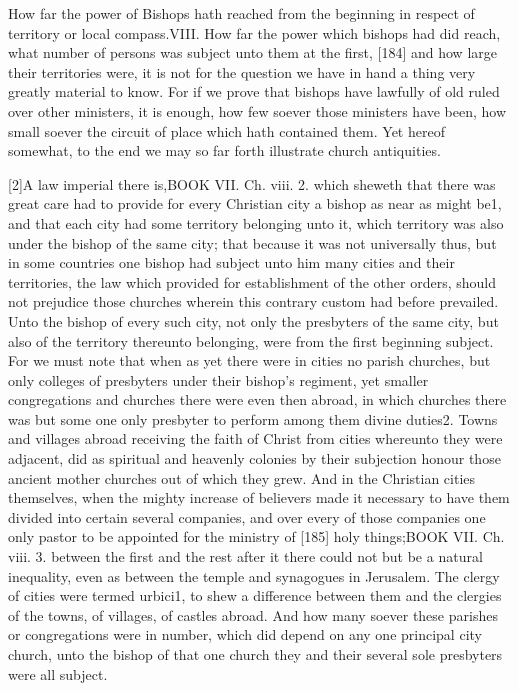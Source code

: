 How far the power of Bishops hath reached from the beginning in respect of territory or local compass.VIII. How far the power which bishops had did reach, what number of persons was subject unto them at the first, [184] and how large their territories were, it is not for the question we have in hand a thing very greatly material to know. For if we prove that bishops have lawfully of old ruled over other ministers, it is enough, how few soever those ministers have been, how small soever the circuit of place which hath contained them. Yet hereof somewhat, to the end we may so far forth illustrate church antiquities.

[2]A law imperial there is,BOOK VII. Ch. viii. 2. which sheweth that there was great care had to provide for every Christian city a bishop as near as might be1, and that each city had some territory belonging unto it, which territory was also under the bishop of the same city; that because it was not universally thus, but in some countries one bishop had subject unto him many cities and their territories, the law which provided for establishment of the other orders, should not prejudice those churches wherein this contrary custom had before prevailed. Unto the bishop of every such city, not only the presbyters of the same city, but also of the territory thereunto belonging, were from the first beginning subject. For we must note that when as yet there were in cities no parish churches, but only colleges of presbyters under their bishop’s regiment, yet smaller congregations and churches there were even then abroad, in which churches there was but some one only presbyter to perform among them divine duties2. Towns and villages abroad receiving the faith of Christ from cities whereunto they were adjacent, did as spiritual and heavenly colonies by their subjection honour those ancient mother churches out of which they grew. And in the Christian cities themselves, when the mighty increase of believers made it necessary to have them divided into certain several companies, and over every of those companies one only pastor to be appointed for the ministry of [185] holy things;BOOK VII. Ch. viii. 3. between the first and the rest after it there could not but be a natural inequality, even as between the temple and synagogues in Jerusalem. The clergy of cities were termed urbici1, to shew a difference between them and the clergies of the towns, of villages, of castles abroad. And how many soever these parishes or congregations were in number, which did depend on any one principal city church, unto the bishop of that one church they and their several sole presbyters were all subject.

